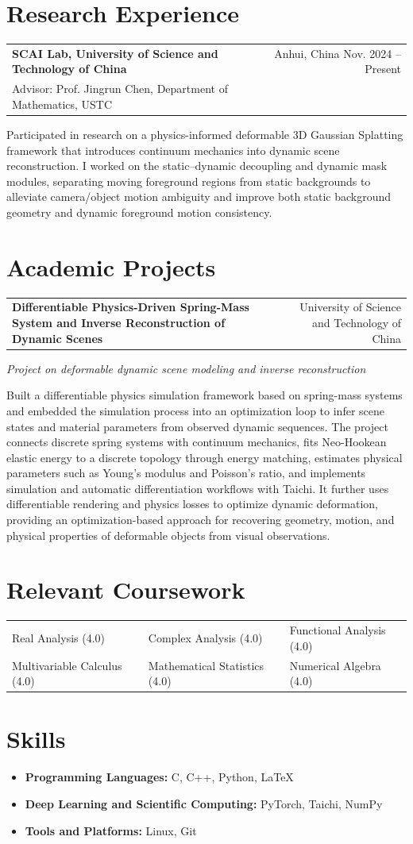 \documentclass[10.5pt,a4paper]{article}
\makeatletter
\newcommand{\resumeExperience}[4]{%
  \begin{tabularx}{\textwidth}{@{}X r@{}}
    \textbf{#1} & #2 \\
    {\small #3} & {\small #4} \\
  \end{tabularx}\vspace{0.10em}
}
\newcommand{\resumeProject}[3]{%
  \begin{tabularx}{\textwidth}{@{}X r@{}}
    \textbf{#1} & #2 \\
  \end{tabularx}
  {\small\textit{#3}}\vspace{0.12em}
}
\newcommand{\resumeParagraph}[1]{%
  {\setlength{\parskip}{0pt}\linespread{1.08}\selectfont #1\par}\vspace{0.10em}
}
\makeatother
\begin{document}
\section{Research Experience}
\resumeExperience
{SCAI Lab, University of Science and Technology of China}{Anhui, China \quad Nov. 2024 -- Present}
{Advisor: Prof. Jingrun Chen, Department of Mathematics, USTC}{}
\resumeParagraph{Participated in research on a physics-informed deformable 3D Gaussian Splatting framework that introduces continuum mechanics into dynamic scene reconstruction. I worked on the static--dynamic decoupling and dynamic mask modules, separating moving foreground regions from static backgrounds to alleviate camera/object motion ambiguity and improve both static background geometry and dynamic foreground motion consistency.}

\section{Academic Projects}
\resumeProject
{Differentiable Physics-Driven Spring-Mass System and Inverse Reconstruction of Dynamic Scenes}{University of Science and Technology of China}
{Project on deformable dynamic scene modeling and inverse reconstruction}
\resumeParagraph{Built a differentiable physics simulation framework based on spring-mass systems and embedded the simulation process into an optimization loop to infer scene states and material parameters from observed dynamic sequences. The project connects discrete spring systems with continuum mechanics, fits Neo-Hookean elastic energy to a discrete topology through energy matching, estimates physical parameters such as Young's modulus and Poisson's ratio, and implements simulation and automatic differentiation workflows with Taichi. It further uses differentiable rendering and physics losses to optimize dynamic deformation, providing an optimization-based approach for recovering geometry, motion, and physical properties of deformable objects from visual observations.}

\section{Relevant Coursework}
\begin{tabularx}{\textwidth}{>{\raggedright\arraybackslash}X >{\raggedright\arraybackslash}X >{\raggedright\arraybackslash}X}
Real Analysis (4.0) & Complex Analysis (4.0) & Functional Analysis (4.0) \\
Multivariable Calculus (4.0) & Mathematical Statistics (4.0) & Numerical Algebra (4.0)
\end{tabularx}

\section{Skills}
\begin{itemize}
    \item \textbf{Programming Languages:} C, C++, Python, \LaTeX
    \item \textbf{Deep Learning and Scientific Computing:} PyTorch, Taichi, NumPy
    \item \textbf{Tools and Platforms:} Linux, Git
\end{itemize}
\end{document}
